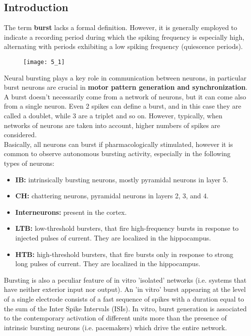 \subsection{Introduction}
The term \textbf{burst} lacks a formal definition. However, it is generally employed to indicate a recording period during which the spiking frequency is especially high, alternating with periods exhibiting a low spiking frequency (quiescence periods).
\begin{figure}[H]
    \texttt{[image: 5\_1]}
    \centering
\end{figure}
Neural bursting plays a key role in communication between neurons, in particular
burst neurons are crucial in \textbf{motor pattern generation and synchronization}.
A burst doesn't necessarily come from a network of neurons, but it can come also from a single neuron. Even 2 spikes can define a burst, and in this case they are called a doublet, while 3 are a triplet and so on. However, typically, when networks of neurons are taken into account, higher numbers of spikes are considered.\\
Basically, all neurons can burst if pharmacologically stimulated, however
it is common to observe autonomous bursting activity, especially in the following
types of neurons:
\begin{itemize}
    \item \textbf{IB:} intrinsically bursting neurons, mostly pyramidal neurons in
          layer 5.
    \item \textbf{CH:} chattering neurons, pyramidal neurons in layers 2, 3, and 4.
    \item \textbf{Interneurons:} present in the cortex.
    \item \textbf{LTB:} low-threshold bursters, that fire high-frequency bursts in
          response to injected pulses of current. They are localized in the hippocampus.
    \item \textbf{HTB:} high-threshold bursters, that fire bursts only in response to
          strong long pulses of current. They are localized in the hippocampus.
\end{itemize}
Bursting is also a peculiar feature of in vitro 'isolated' networks (i.e. systems that have neither exterior input nor output).
An 'in vitro' burst appearing at the level of a single electrode consists of a fast sequence of spikes with a duration equal to the sum of the Inter Spike Intervals (ISIs).
In vitro, burst generation is associated to the contemporary activation of different units more than the presence of intrinsic bursting neurons (i.e. pacemakers) which drive the entire network.
